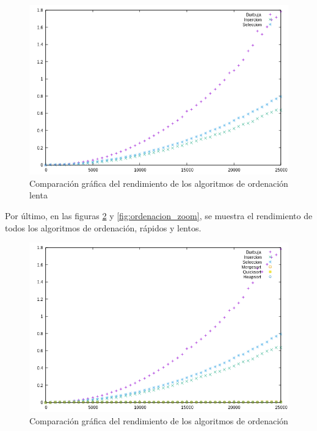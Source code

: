 \documentclass{article}
\begin{document}
	\begin{figure}[H]
		\centering
		\includegraphics[totalheight=8cm]{img/ordenacion_lenta}
		\caption{Comparación gráfica del rendimiento de los algoritmos de ordenación lenta}
		\label{fig:ordenacion_lenta}
	\end{figure}
Por último, en las figuras \ref{fig:ordenacion} y \ref{fig:ordenacion_zoom}, se muestra el rendimiento de todos los algoritmos de ordenación, rápidos y lentos.
	\begin{figure}[H]
		\centering
		\includegraphics[totalheight=8cm]{img/ordenacion}
		\caption{Comparación gráfica del rendimiento de los algoritmos de ordenación}
		\label{fig:ordenacion}
	\end{figure}
\end{document}
